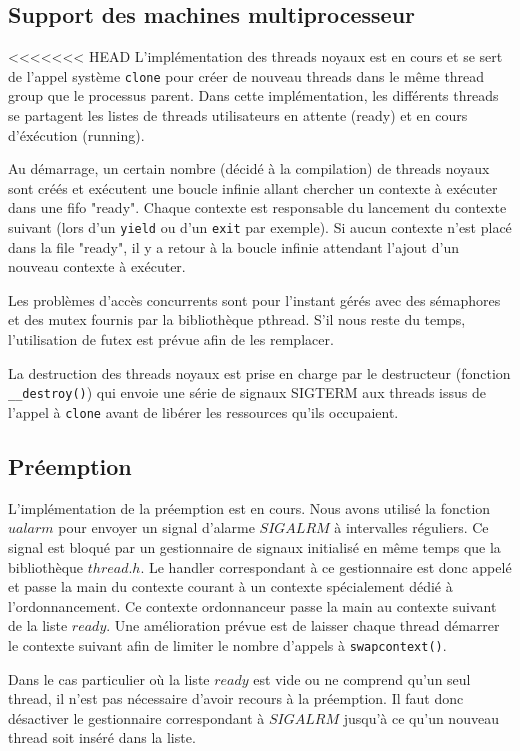 \subsection{Support des machines multiprocesseur}

<<<<<<< HEAD
L'implémentation des threads noyaux est en cours et se sert de l'appel système
\verb!clone! pour créer de nouveau threads dans le même thread group que le
processus parent. Dans cette implémentation, les différents threads se
partagent les listes de threads utilisateurs en attente (ready) et en cours
d'éxécution (running).

Au démarrage, un certain nombre (décidé à la compilation) de threads noyaux
sont créés et exécutent une boucle infinie allant chercher un contexte à
exécuter dans une fifo "ready". Chaque contexte est responsable du lancement du
contexte suivant (lors d'un \verb!yield! ou d'un \verb!exit! par exemple). Si
aucun contexte n'est placé dans la file "ready", il y a retour à la boucle
infinie attendant l'ajout d'un nouveau contexte à exécuter.

Les problèmes d'accès concurrents sont pour l'instant gérés avec des sémaphores
et des mutex fournis par la bibliothèque pthread. S'il nous reste du temps,
l'utilisation de futex est prévue afin de les remplacer.

La destruction des threads noyaux est prise en charge par le destructeur
(fonction \verb!__destroy()!) qui envoie une série de signaux SIGTERM aux
threads issus de l'appel à \verb!clone! avant de libérer les ressources qu'ils
occupaient.


\subsection{Préemption} 

L'implémentation de la préemption est en cours. Nous avons utilisé la fonction
$ualarm$ pour envoyer un signal d'alarme $SIGALRM$ à intervalles réguliers. Ce
signal est bloqué par un gestionnaire de signaux initialisé en même temps que
la bibliothèque $thread.h$. Le handler correspondant à ce gestionnaire est donc
appelé et passe la main du contexte courant à un contexte spécialement dédié à
l'ordonnancement. Ce contexte ordonnanceur passe la main au contexte suivant de
la liste $ready$. Une amélioration prévue est de laisser chaque thread démarrer
le contexte suivant afin de limiter le nombre d'appels à \verb!swapcontext()!.

Dans le cas particulier où la liste $ready$ est vide ou ne comprend qu'un seul
thread, il n'est pas nécessaire d'avoir recours à la préemption. Il faut donc
désactiver le gestionnaire correspondant à $SIGALRM$ jusqu'à ce qu'un nouveau
thread soit inséré dans la liste.

